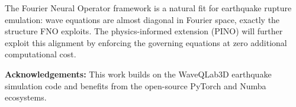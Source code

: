 \documentclass[12pt, a4paper]{article}
\theoremstyle{definition}
\begin{document}
\vspace{12pt}
\noindent The Fourier Neural Operator framework is a natural fit for earthquake
rupture emulation: wave equations are almost diagonal in Fourier space,
exactly the structure FNO exploits.  The physics-informed extension (PINO)
will further exploit this alignment by enforcing the governing equations
at zero additional computational cost.

\vspace{16pt}
\noindent\textbf{Acknowledgements:} This work builds on the WaveQLab3D
earthquake simulation code and benefits from the open-source PyTorch and
Numba ecosystems.
\end{document}

